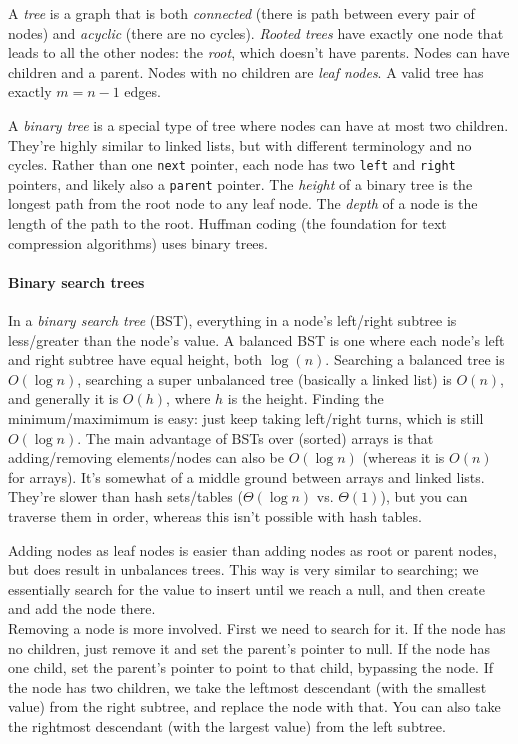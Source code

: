 \documentclass[table, xcdraw]{article}%
\begin{document}
A \emph{tree} is a graph that is both \emph{connected} (there is path between every pair of nodes) and \emph{acyclic} (there are no cycles). \emph{Rooted trees} have exactly one node that leads to all the other nodes: the \emph{root}, which doesn't have parents. Nodes can have children and a parent. Nodes with no children are \emph{leaf nodes}. A valid tree has exactly $m = n-1$ edges.

A \emph{binary tree} is a special type of tree where nodes can have at most two children. They're highly similar to linked lists, but with different terminology and no cycles. Rather than one \texttt{next} pointer, each node has two \texttt{left} and \texttt{right} pointers, and likely also a \texttt{parent} pointer. The \emph{height} of a binary tree is the longest path from the root node to any leaf node. The \emph{depth} of a node is the length of the path to the root. Huffman coding (the foundation for text compression algorithms) uses binary trees.

\paragraph{Binary search trees}

In a \emph{binary search tree} (BST), everything in a node's left/right subtree is less/greater than the node's value. A balanced BST is one where each node's left and right subtree have equal height, both $\log(n)$. Searching a balanced tree is $O(\log n)$, searching a super unbalanced tree (basically a linked list) is $O(n)$, and generally it is $O(h)$, where $h$ is the height. Finding the minimum/maximimum is easy: just keep taking left/right turns, which is still $O(\log n)$. The main advantage of BSTs over (sorted) arrays is that adding/removing elements/nodes can also be $O(\log n)$ (whereas it is $O(n)$ for arrays). It's somewhat of a middle ground between arrays and linked lists. They're slower than hash sets/tables ($\Theta(\log n)$ vs. $\Theta(1)$), but you can traverse them in order, whereas this isn't possible with hash tables.

Adding nodes as leaf nodes is easier than adding nodes as root or parent nodes, but does result in unbalances trees. This way is very similar to searching; we essentially search for the value to insert until we reach a null, and then create and add the node there.\\
Removing a node is more involved. First we need to search for it. If the node has no children, just remove it and set the parent's pointer to null. If the node has one child, set the parent's pointer to point to that child, bypassing the node. If the node has two children, we take the leftmost descendant (with the smallest value) from the right subtree, and replace the node with that. You can also take the rightmost descendant (with the largest value) from the left subtree.
\end{document}
